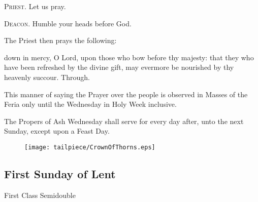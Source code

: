 \textsc{Priest.} Let us pray.\par
\textsc{Deacon.} Humble your heads before God.\par
\begin{rubric}
    The Priest then prays the following:
\end{rubric}
 down in mercy, O Lord, upon those who bow before thy majesty: that they who have been refreshed by the divine gift, may evermore be nourished by thy heavenly succour. Through.
\begin{rubric}
This manner of saying the Prayer over the people is observed in Masses of the Feria only until the Wednesday in Holy Week inclusive.
\end{rubric}
\begin{rubric}
    The Propers of Ash Wednesday shall serve for every day after, unto the next Sunday, except upon a Feast Day.
\end{rubric}

\vfill

  \begin{figure}[H]
  	\centering
  	\texttt{[image: tailpiece/CrownOfThorns.eps]}
  \end{figure}

\clearpage
\subsection{First Sunday of Lent}
\begin{inhead}
{First Class Semidouble}
\end{inhead}


